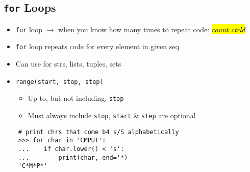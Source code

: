 \documentclass{article}
\begin{document}
\subsection{\texttt{for} Loops}
    \begin{itemize}
        \item \texttt{for} loop $\rightarrow$ when you know how many times to repeat code: \hl{\textit{count ctrld}}
            \item \texttt{for} loop repeats code for every element in given seq
            \item Can use for strs, lists, tuples, sets
            \item \texttt{range(start, stop, step)}
                \begin{itemize}
                    \item Up to, but not including, \texttt{stop}
                    \item Must always include \texttt{stop}, \texttt{start} \& \texttt{step} are optional
                \end{itemize}
    \end{itemize}
\vspace{-1em}
\begin{lstlisting}
    # print chrs that come b4 s/S alphabetically
    >>> for char in 'CMPUT':
    ...    if char.lower() < 's':
    ...        print(char, end='*)
    'C*M*P*'
\end{lstlisting}

\end{document}
